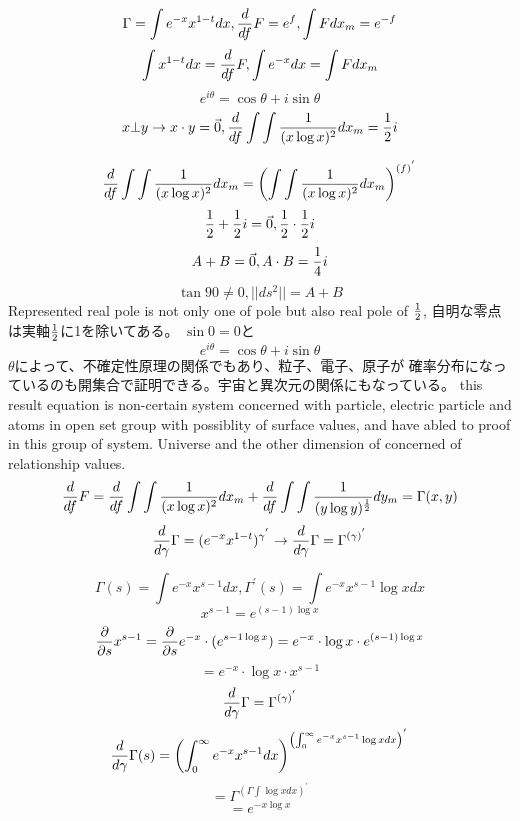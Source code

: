 \documentclass{jsarticle}
\begin{document}
{  $$ \Gamma = \int {e^{-x}x^{1-t}}dx, 
  {d \over df}F = e^f, \int F dx_m = e^{-f} $$
  $$ \int x^{1-t}dx = {d \over df}F, \int e^{-x}dx = \int F dx_m $$
  $$ e^{i \theta} = \cos \theta + i \sin \theta $$
  $$ x \bot y \to x \cdot y = \vec{0}, 
  {d \over df}\int \int{1 \over (x \log x)^2}dx_m = {1 \over 2}i $$

  $$ {d \over df}\int \int{1 \over (x \log x)^2}dx_m = 
  \left(\int \int {1 \over (x \log x)^2}dx_m \right)^{(f)^{'}}$$
  $$ {1 \over 2} + {1 \over 2}i = \vec{0}, {1 \over 2}\cdot{1 \over 2}i $$
  $$ A + B  =  \vec{0}, A \cdot B = {1 \over 4}i $$
  $$  \tan 90 \neq 0, ||ds^2|| = A + B $$
  Represented real pole is not only one of pole but also real pole of 
  $ {1 \over 2} $, 
  自明な零点は実軸${1 \over 2}  $に1を除いてある。
  $\sin 0 = 0$と$$ e^{i \theta} = \cos \theta + i \sin \theta $$
  $\theta $によって、不確定性原理の関係でもあり、粒子、電子、原子が
  確率分布になっているのも開集合で証明できる。宇宙と異次元の関係にもなっている。
  this result equation is non-certain system concerned with particle, electric 
  particle and atoms in open set group with possiblity of surface values,
  and have abled to proof in this group of system. Universe and the other
  dimension of concerned of relationship values.
  $$ {d \over df}F = {d \over df} \int \int{1 \over (x \log x)^2}dx_m 
  + {d \over df} \int \int {1 \over (y \log y)^{1 \over 2}}dy_m
  = \Gamma(x,y) $$
  $$ {d \over d \gamma}\Gamma = (e^{-x}x^{1-t})^{\gamma^{'}} \to
  {d \over d \gamma}\Gamma = \Gamma^{(\gamma)^{'}}$$



    $$ \Gamma(s) = \int e^{-x} x^{s - 1}dx, \Gamma^{'}(s)
    = \int e^{-x} x^{s - 1}\log x dx $$
    $$ x^{s - 1} = e^{(s - 1)\log x} $$
    $$ {\partial \over \partial s}x^{s - 1} =
       {\partial \over \partial s}e^{-x}\cdot (e^{{s - 1}\log x}) 
       = e^{-x}\cdot \log x \cdot e^{(s - 1) \log x} $$
    $$ = e^{-x}\cdot \log x \cdot x^{s - 1} $$
    $$ {d \over d \gamma}\Gamma = \Gamma^{(\gamma)^{'}} $$
    $$ {d \over d \gamma}\Gamma(s) = \left( \int^{\infty}_{0}e^{-x}
    x^{s - 1}dx \right)^{\left(\int^{\infty}_{0}e^{-x}x^{s - 1}\log x dx
    \right)^{'}} $$
    $$ = \Gamma^{(\Gamma \int \log x dx)^{'}} $$
    $$ = e^{-x \log x} $$

}
\end{document}
